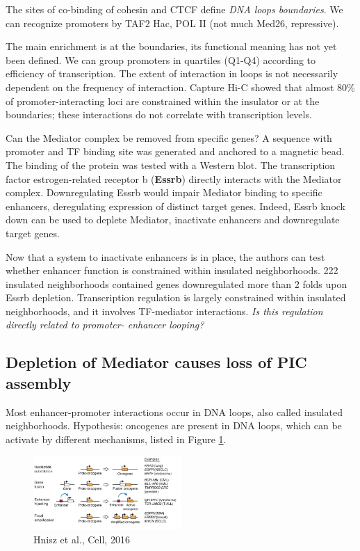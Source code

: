 The sites of co-binding of cohesin and CTCF define \emph{DNA loops boundaries}. We can recognize promoters by TAF2 Hac, POL II (not much Med26, repressive).

The main enrichment is at the boundaries, its functional meaning has not yet been defined. We can group promoters in quartiles (Q1-Q4) according to efficiency of transcription. The extent of interaction in loops is not necessarily dependent on the frequency of interaction. Capture Hi-C showed that almost 80\% of promoter-interacting loci are constrained within the insulator or at the boundaries; these interactions do not correlate with transcription levels. 

Can the Mediator complex be removed from specific genes? A sequence with promoter and TF binding site was generated and anchored to a magnetic bead.  The binding of the protein was tested with a Western blot. The transcription factor estrogen-related receptor b (\textbf{Essrb}) directly interacts with the Mediator complex. Downregulating Essrb would impair Mediator binding to specific enhancers, deregulating expression of distinct target genes. Indeed, Essrb knock down can be used to deplete Mediator, inactivate enhancers and downregulate target genes.

Now that a system to inactivate enhancers is in place, the authors can test whether enhancer function is constrained within insulated neighborhoods. 222 insulated neighborhoods contained genes downregulated more than 2 folds upon Essrb depletion. Transcription regulation is largely constrained within insulated neighborhoods, and it involves TF-mediator interactions. \emph{Is this regulation directly related to promoter- enhancer looping?}

\subsection{Depletion of Mediator causes loss of PIC assembly}

Most enhancer-promoter interactions occur in DNA loops, also called insulated neighborhoods. 
Hypothesis: oncogenes are present in DNA loops, which can be activate by different mechanisms, listed in Figure \ref{fig:proto}.

\begin{figure}
\centering
\includegraphics[width=0.5\textwidth]{../_resources/4eb79fba5a169cc3d31f5400dee44c80.png}
\caption{Hnisz et al., Cell, 2016}
\label{fig:proto}
\end{figure}

